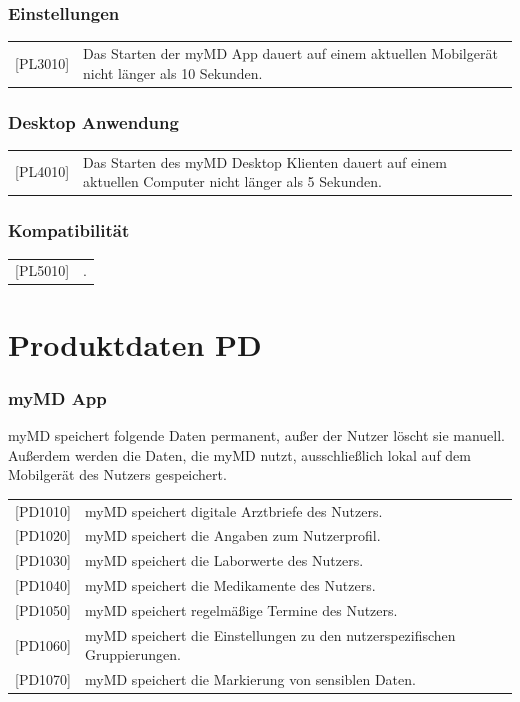 \documentclass[a4paper]{scrreprt}
\begin{document}
\subsection{Einstellungen}
\begin{tabular}{lll}
[PL3010]&  \multicolumn{2}{p{12cm}}{Das Starten der myMD App dauert auf einem aktuellen Mobilgerät nicht länger als 10 Sekunden.}\\


\end{tabular}

\subsection{Desktop Anwendung}
\begin{tabular}{lll}
[PL4010]&  \multicolumn{2}{p{12cm}}{Das Starten des myMD Desktop Klienten dauert auf einem aktuellen Computer nicht länger als 5 Sekunden.}\\

\end{tabular}

\subsection{Kompatibilität}
\begin{tabular}{lll}
[PL5010]&  \multicolumn{2}{p{12cm}}{.}\\

\end{tabular}


\chapter{Produktdaten PD}
\subsection{myMD \gls{App}}
myMD speichert folgende Daten permanent, außer der Nutzer löscht sie manuell. Außerdem werden die Daten, die myMD nutzt, ausschließlich lokal auf dem Mobilgerät des Nutzers gespeichert.
\newline
\newline
\begin{tabular}{lll}
[PD1010]&  \multicolumn{2}{p{12cm}}{myMD speichert digitale Arztbriefe des Nutzers.}\\
{[PD1020]} &  \multicolumn{2}{p{12cm}}{myMD speichert die Angaben zum Nutzerprofil.}\\
{[PD1030]} &  \multicolumn{2}{p{12cm}}{myMD speichert die Laborwerte des Nutzers.}\\
{[PD1040]} &  \multicolumn{2}{p{12cm}}{myMD speichert die Medikamente des Nutzers.}  \\
{[PD1050]} &  \multicolumn{2}{p{12cm}}{myMD speichert regelmäßige Termine des Nutzers.}  \\
{[PD1060]} &  \multicolumn{2}{p{12cm}}{myMD speichert die Einstellungen zu den nutzerspezifischen Gruppierungen.}  \\
{[PD1070]} &  \multicolumn{2}{p{12cm}}{myMD speichert die Markierung von sensiblen Daten.}  \\

\end{tabular}
\end{document}
